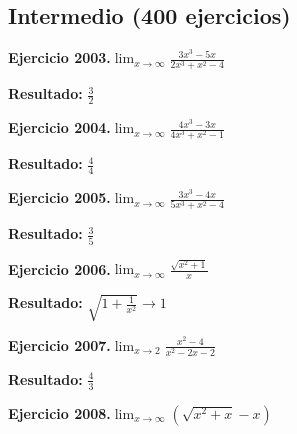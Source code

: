 \documentclass[10pt,a4paper]{article}
\begin{document}
\newpage
\subsection{Intermedio (400 ejercicios)}

\begin{ejbox}
\textbf{Ejercicio 2003.}\quad $\lim_{x\to \infty} \frac{3x^3 - 5x}{2x^3 + x^2 - 4}$
\end{ejbox}

\begin{solbox}
\textbf{Resultado:} \(\displaystyle \frac{3}{2}\)
\end{solbox}

\begin{ejbox}
\textbf{Ejercicio 2004.}\quad $\lim_{x\to \infty} \frac{4x^3 - 3x}{4x^3 + x^2 - 1}$
\end{ejbox}

\begin{solbox}
\textbf{Resultado:} \(\displaystyle \frac{4}{4}\)
\end{solbox}

\begin{ejbox}
\textbf{Ejercicio 2005.}\quad $\lim_{x\to \infty} \frac{3x^3 - 4x}{5x^3 + x^2 - 4}$
\end{ejbox}

\begin{solbox}
\textbf{Resultado:} \(\displaystyle \frac{3}{5}\)
\end{solbox}

\newpage
\begin{ejbox}
\textbf{Ejercicio 2006.}\quad $\lim_{x\to \infty} \frac{\sqrt{x^2+1}}{x}$
\end{ejbox}

\begin{solbox}
\textbf{Resultado:} \(\displaystyle \sqrt{1+\frac{1}{x^2}} \to 1\)
\end{solbox}

\begin{ejbox}
\textbf{Ejercicio 2007.}\quad $\lim_{x\to 2} \frac{x^2-4}{x^2-2x-2}$
\end{ejbox}

\begin{solbox}
\textbf{Resultado:} \(\displaystyle \frac{4}{3}\)
\end{solbox}

\begin{ejbox}
\textbf{Ejercicio 2008.}\quad $\lim_{x\to \infty} (\sqrt{x^2+x} - x)$
\end{ejbox}
\end{document}

